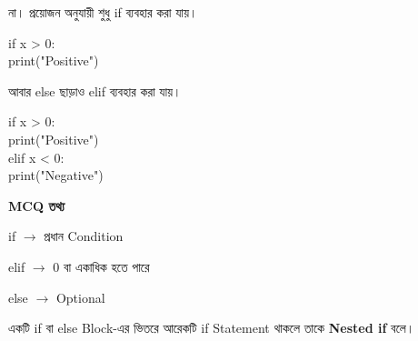 
না। প্রয়োজন অনুযায়ী শুধু
\textenglish{\ttfamily if}
ব্যবহার করা যায়।

\begin{codebox}
\begin{english}
\ttfamily
if x > 0:\\
\hspace*{4mm}print("Positive")
\end{english}
\end{codebox}

আবার
\textenglish{\ttfamily else}
ছাড়াও
\textenglish{\ttfamily elif}
ব্যবহার করা যায়।

\begin{codebox}
\begin{english}
\ttfamily
if x > 0:\\
\hspace*{4mm}print("Positive")\\
elif x < 0:\\
\hspace*{4mm}print("Negative")
\end{english}
\end{codebox}

\begin{rememberbox}

\textbf{\color{deepOrange}MCQ তথ্য}

\begin{center}

\textenglish{\ttfamily if}
\(\longrightarrow\)
প্রধান Condition

\qquad

\textenglish{\ttfamily elif}
\(\longrightarrow\)
0 বা একাধিক হতে পারে

\qquad

\textenglish{\ttfamily else}
\(\longrightarrow\)
Optional

\end{center}

\end{rememberbox}



একটি
\textenglish{\ttfamily if}
বা
\textenglish{\ttfamily else}
Block-এর ভিতরে আরেকটি
\textenglish{\ttfamily if}
Statement থাকলে তাকে
\textbf{Nested if} বলে।

